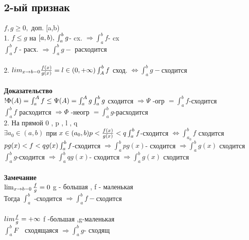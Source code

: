 ﻿\documentclass[12pt, a4paper]{article}
\begin{document}
       \subsection{2-ый признак}
     $  f, g \geq 0 ,$ доп. [a,b) \\
     1. $f \leq g$ на $ [a,b),\\
      \int_a^b g $- cx. $ \Rightarrow \int_a^b f $- cx \\ 
      $\int_a^b f$ - расх. $ \Rightarrow \int_a^b g -$ расходится  \\
      \\
      2. $lim_{x \rightarrow b - 0} \frac{f(x)}{g(x)} = l \in (0 , +\infty) \\
      \int_A^b f$ сход. $ \Leftrightarrow \int_a^b g - $сходится \\
      \\
      \textbf{Доказательство}\\
      $ ! \Phi(A) = \int_a^A f \leq \Psi(A) = \int_a^A g \\
      \int_a^b g $ сходится $ \Rightarrow \Psi $ -огр $ = \int_a^b f $-сходится \\
      $\int_a^b f $ расходится $ \Rightarrow \Phi $ -неогр $ = \int_a^b g $-расходится \\
      2. На прямой 0 , p , l , q \\
      $ \exists  a_0 \in (a,b) $ при $  x \in (a_0,b) p < \frac{f(x)}{g(x)} < q \\
      \int_a^b f $-сходится $ \Leftrightarrow \int_{a_0}^b f $ сходится \\
     $ p g(x) < f < q g(x) \\
     \int_a^b f $-сходится  $ \Rightarrow \int_a^b p g(x) $- сходится $ \Rightarrow \int _a^b g(x) $ сходится \\
     $  \int_a^b g$-сходится  $ \Rightarrow \int_a^b q g(x) $- сходится $ \Rightarrow \int _a^b g(x) $ сходится \\
     \\
     \textbf{Замечание}\\
     $ \lim_{x \rightarrow b - 0} \frac{f}{g} = 0 \\$
     g - большая ,  f - маленькая \\
    Тогда $ \int_a^b$ -сходится $ \Rightarrow \int_a^b f- $сходится \\
   \\
   $lim \frac{f}{g} = +\infty \\$
   f -большая ,g-маленькая \\
   $ \int_a^b F $  сходящаяся $ \Rightarrow \int_a^b g $- сходящ\\   
   
\end{document}
